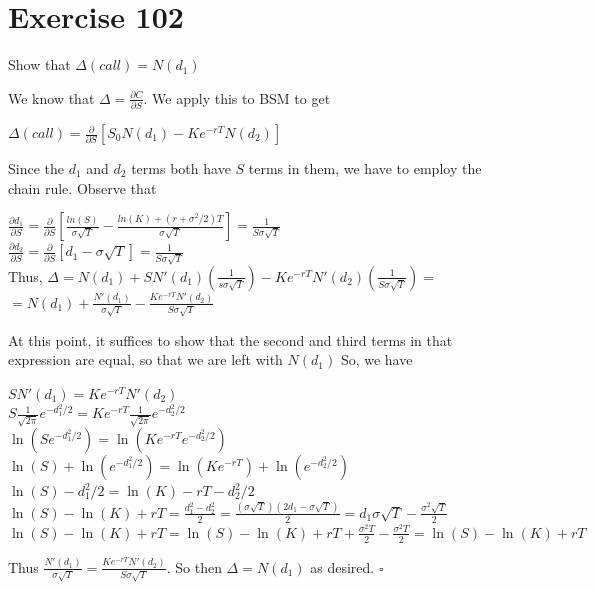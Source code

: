 \documentclass{article}
\begin{document}
\section*{Exercise 102}
Show that $\Delta(call) = N(d_1)$
\begin{flushleft}
    We know that $\Delta = \frac{\partial C}{\partial S}$. We apply this to BSM to get
    \begin{center}
        $\Delta(call) = \frac{\partial}{\partial S}[S_0N(d_1) - Ke^{-rT}N(d_2)]$
    \end{center}
    Since the $d_1$ and $d_2$ terms both have $S$ terms in them, we have to employ the chain rule. Observe that
    \begin{center}
        $\frac{\partial d_1}{\partial S} = \frac{\partial}{\partial S}[\frac{ln(S)}{\sigma \sqrt{T}} - \frac{ln(K) + (r + \sigma^2 / 2)T}{\sigma \sqrt{T}}] = \frac{1}{S\sigma \sqrt{T}}$ \\
        $\frac{\partial d_2}{\partial S} = \frac{\partial}{\partial S}[d_1 - \sigma \sqrt{T}] = \frac{1}{S\sigma \sqrt{T}}$ \\
        Thus, $\Delta = N(d_1) + SN'(d_1)(\frac{1}{s\sigma \sqrt{T}}) - Ke^{-rT}N'(d_2)(\frac{1}{S\sigma \sqrt{T}}) = $\\
        $= N(d_1) + \frac{N'(d_1)}{\sigma \sqrt{T}} - \frac{Ke^{-rT}N'(d_2)}{S\sigma \sqrt{T}}$
    \end{center}
    At this point, it suffices to show that the second and third terms in that expression are equal, so that we are left with $N(d_1)$
    So, we have
    \begin{center}
        $SN'(d_1) = Ke^{-rT}N'(d_2)$ \\
        $S \frac{1}{\sqrt{2\pi}}e^{-d_1^2/2} = Ke^{-rT}\frac{1}{\sqrt{2\pi}}e^{-d_2^2/2}$ \\
        $\ln(Se^{-d_1^2/2}) = \ln(Ke^{-rT}e^{-d_2^2/2})$ \\
        $\ln(S) + \ln(e^{-d_1^2/2}) = \ln(Ke^{-rT}) + \ln(e^{-d_2^2/2})$ \\
        $\ln(S) - d_1^2/2 = \ln(K) - rT - d_2^2/2$ \\
        $\ln(S) - \ln(K) + rT = \frac{d_1^2-d_2^2}{2} = \frac{(\sigma \sqrt{T})(2d_1 - \sigma\sqrt{T})}{2} = d_1 \sigma \sqrt{T} - \frac{\sigma^2 \sqrt{T}}{2}$ \\
        $\ln(S) - \ln(K) + rT = \ln(S) - \ln(K) + rT + \frac{\sigma^2T}{2} - \frac{\sigma^2T}{2} = \ln(S) - \ln(K) + rT$
    \end{center}
    Thus $\frac{N'(d_1)}{\sigma \sqrt{T}} = \frac{Ke^{-rT}N'(d_2)}{S\sigma \sqrt{T}}$. So then $\Delta = N(d_1)$ as desired. $\square$
\end{flushleft}
\end{document}
